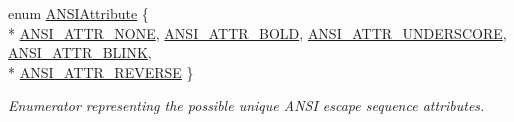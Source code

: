 \begin{DoxyCompactItemize}
\item 
enum \hyperlink{namespacechaos_1_1io_1_1format_af01119682ec0bc616b49641e0c2a7ccf}{A\+N\+S\+I\+Attribute} \{ \\*
\hyperlink{namespacechaos_1_1io_1_1format_af01119682ec0bc616b49641e0c2a7ccfa3154b286513beb167bb516ea15f1cfb5}{A\+N\+S\+I\+\_\+\+A\+T\+T\+R\+\_\+\+N\+O\+N\+E}, 
\hyperlink{namespacechaos_1_1io_1_1format_af01119682ec0bc616b49641e0c2a7ccfaada31e77e1e80ea78e0cd08a126271b3}{A\+N\+S\+I\+\_\+\+A\+T\+T\+R\+\_\+\+B\+O\+L\+D}, 
\hyperlink{namespacechaos_1_1io_1_1format_af01119682ec0bc616b49641e0c2a7ccfa2f1d142ccf489cba5710445abd48555f}{A\+N\+S\+I\+\_\+\+A\+T\+T\+R\+\_\+\+U\+N\+D\+E\+R\+S\+C\+O\+R\+E}, 
\hyperlink{namespacechaos_1_1io_1_1format_af01119682ec0bc616b49641e0c2a7ccfacd3671458d96396a0fec66c993244186}{A\+N\+S\+I\+\_\+\+A\+T\+T\+R\+\_\+\+B\+L\+I\+N\+K}, 
\\*
\hyperlink{namespacechaos_1_1io_1_1format_af01119682ec0bc616b49641e0c2a7ccfaa7b58f4c0365d47d2bc98a4587521806}{A\+N\+S\+I\+\_\+\+A\+T\+T\+R\+\_\+\+R\+E\+V\+E\+R\+S\+E}
 \}\begin{DoxyCompactList}\small\item\em Enumerator representing the possible unique A\+N\+S\+I escape sequence attributes. \end{DoxyCompactList}
\end{DoxyCompactItemize}
